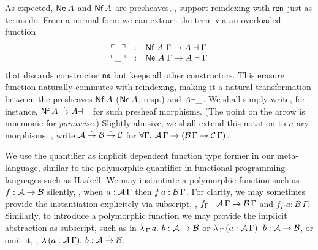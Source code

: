 \documentclass[sigplan,screen,fleqn]{acmart}
\begin{document}
As expected, $\mathsf{Ne}^{}\,A$ and $\mathsf{Nf}\,A$ are presheaves,
\ie, support reindexing with $\mathsf{ren}$ just as terms do.
From a normal form we can extract the term via an overloaded function
\[
\begin{array}{lcl}
\ulcorner\_\urcorner & : & \mathsf{Nf}\;A\;\Gamma \to A \dashv \Gamma \\
\ulcorner\_\urcorner & : & \mathsf{Ne}^{}\;A\;\Gamma \to A \dashv \Gamma \\
\end{array}
\]
that discards constructor $\mathsf{ne}$ but keeps all other constructors.
This erasure function naturally commutes with reindexing, making it a
natural transformation between the presheaves $\mathsf{Nf}\,A$ ($\mathsf{Ne}^{}\,A$,
resp.) and $A{\dashv}\_$.  We shall simply write, for instance,
$\mathsf{Nf}\,A \stackrel{\cdot}{\to} A{\dashv}\_$ for such presheaf morphisms.
(The point on the arrow is mnemonic for \emph{pointwise}.)
Slightly abusive, we shall extend this notation to $n$-ary
morphisms, \eg, write $\mathcal{A} \stackrel{\cdot}{\to} \mathcal{B} \stackrel{\cdot}{\to} \mathcal{C}$ for
$\forall \Gamma.\ \mathcal{A}\,\Gamma \to (\mathcal{B}\,\Gamma \to \mathcal{C}\,\Gamma)$.

We use the \fbox{$\forall$} quantifier as implicit dependent function
type former in our meta-language,
similar to the polymorphic quantifier in functional
programming languages such as Haskell.  We may instantiate a
polymorphic function such as $f : \mathcal{A} \stackrel{\cdot}{\to} \mathcal{B}$ silently, \eg, when $a
: \mathcal{A}\,\Gamma$ then $f\,a : \mathcal{B}\,\Gamma$.  For clarity, we may sometimes
provide the instantiation explicitely via subscript, \eg, $f_\Gamma :
\mathcal{A}\,\Gamma \to \mathcal{B}\,\Gamma$ and $f_\Gamma\,a : B\,\Gamma$.  Similarly,
to introduce a polymorphic function we may provide the implicit
abstraction as subscript, such as in
$\lambda\,{}_\Gamma\, a.\ b : \mathcal{A} \stackrel{\cdot}{\to} \mathcal{B}$ or
$\lambda\,{}_\Gamma\, (a : \mathcal{A}\,\Gamma).\ b : \mathcal{A} \stackrel{\cdot}{\to} \mathcal{B}$, or
omit it, \eg,
$\lambda\,(a : \mathcal{A}\,\Gamma).\ b : \mathcal{A} \stackrel{\cdot}{\to} \mathcal{B}$.
\end{document}
